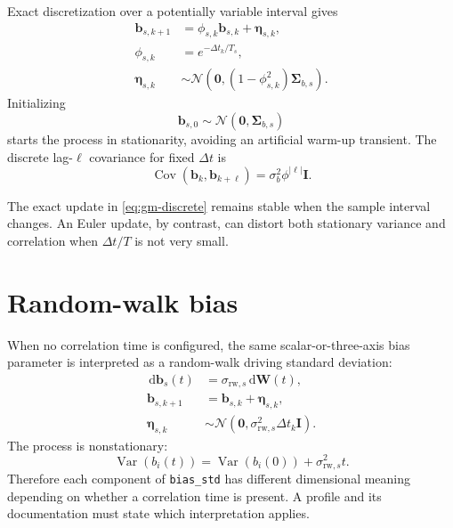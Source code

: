 \documentclass[11pt,oneside,headings=big]{scrreprt}
\newcommand{\Normal}{\mathcal{N}}
\newcommand{\Cov}{\operatorname{Cov}}
\newcommand{\Var}{\operatorname{Var}}
\newcommand{\dd}{\,\mathrm{d}}
\newcommand{\vect}[1]{\bm{#1}}
\newcommand{\mat}[1]{\bm{#1}}
\newcommand{\field}[1]{\texttt{#1}}
\begin{document}
    Exact discretization over a potentially variable interval gives
    \begin{align}
        \vect b_{s,k+1}
        &=\phi_{s,k}\vect b_{s,k}+\vect\eta_{s,k},\\
        \phi_{s,k}&=e^{-\Delta t_k/T_s},\\
        \vect\eta_{s,k}
        &\sim\Normal\!\left(
                          \vect0,
            (1-\phi_{s,k}^{2})\mat\Sigma_{b,s}
        \right).
        \label{eq:gm-discrete}
    \end{align}
    Initializing
    \begin{equation}
        \vect b_{s,0}\sim\Normal(\vect0,\mat\Sigma_{b,s})
        \label{eq:gm-initial}
    \end{equation}
    starts the process in stationarity, avoiding an artificial warm-up transient.
    The discrete lag-\(\ell\) covariance for fixed \(\Delta t\) is
    \begin{equation}
        \Cov(\vect b_k,\vect b_{k+\ell})
        =\sigma_b^2\phi^{\lvert\ell\rvert}\mat I.
        \label{eq:gm-discrete-autocov}
    \end{equation}

    \begin{engineeringbox}
        The exact update in \cref{eq:gm-discrete} remains stable when the sample interval
        changes. An Euler update, by contrast, can distort both stationary variance and
        correlation when \(\Delta t/T\) is not very small.
    \end{engineeringbox}


    \section{Random-walk bias}
    When no correlation time is configured, the same scalar-or-three-axis bias
    parameter is interpreted as a random-walk driving standard deviation:
    \begin{align}
        \dd\vect b_s(t)&=\sigma_{\mathrm{rw},s}\dd\vect W(t),\\
        \vect b_{s,k+1}&=\vect b_{s,k}+\vect\eta_{s,k},\\
        \vect\eta_{s,k}&\sim
        \Normal\!\left(\vect0,
                     \sigma_{\mathrm{rw},s}^{2}\Delta t_k\mat I\right).
        \label{eq:random-walk}
    \end{align}
    The process is nonstationary:
    \begin{equation}
        \Var(b_i(t))=\Var(b_i(0))+\sigma_{\mathrm{rw},s}^{2}t.
        \label{eq:rw-variance}
    \end{equation}
    Therefore each component of \field{bias\_std} has different dimensional meaning
    depending on whether a correlation time is present. A profile and its
    documentation must state which interpretation applies.
\end{document}
